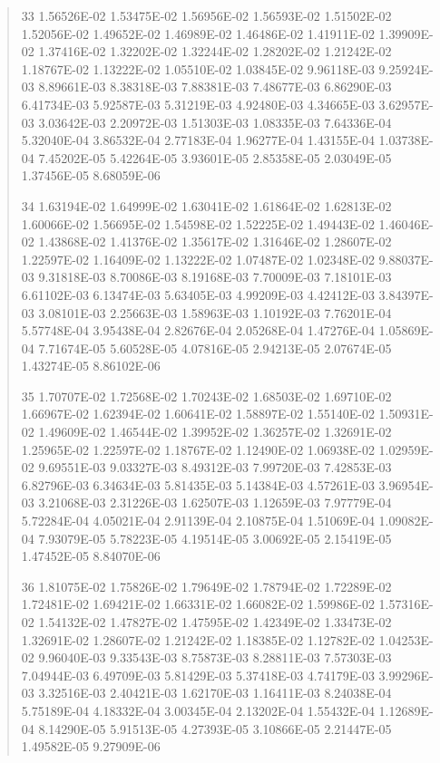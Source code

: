 \documentclass[letterpaper,10pt,english]{sphinxmanual}
\begin{document}
\begin{quote}
\begin{DUlineblock}{0em}
\item[] 33   1.56526E-02  1.53475E-02  1.56956E-02  1.56593E-02  1.51502E-02  1.52056E-02  1.49652E-02  1.46989E-02  1.46486E-02  1.41911E-02  1.39909E-02  1.37416E-02  1.32202E-02  1.32244E-02  1.28202E-02  1.21242E-02  1.18767E-02  1.13222E-02  1.05510E-02  1.03845E-02  9.96118E-03  9.25924E-03  8.89661E-03  8.38318E-03  7.88381E-03  7.48677E-03  6.86290E-03  6.41734E-03  5.92587E-03  5.31219E-03  4.92480E-03  4.34665E-03  3.62957E-03  3.03642E-03  2.20972E-03  1.51303E-03  1.08335E-03  7.64336E-04  5.32040E-04  3.86532E-04  2.77183E-04  1.96277E-04  1.43155E-04  1.03738E-04  7.45202E-05  5.42264E-05  3.93601E-05  2.85358E-05  2.03049E-05  1.37456E-05  8.68059E-06
\item[] 34   1.63194E-02  1.64999E-02  1.63041E-02  1.61864E-02  1.62813E-02  1.60066E-02  1.56695E-02  1.54598E-02  1.52225E-02  1.49443E-02  1.46046E-02  1.43868E-02  1.41376E-02  1.35617E-02  1.31646E-02  1.28607E-02  1.22597E-02  1.16409E-02  1.13222E-02  1.07487E-02  1.02348E-02  9.88037E-03  9.31818E-03  8.70086E-03  8.19168E-03  7.70009E-03  7.18101E-03  6.61102E-03  6.13474E-03  5.63405E-03  4.99209E-03  4.42412E-03  3.84397E-03  3.08101E-03  2.25663E-03  1.58963E-03  1.10192E-03  7.76201E-04  5.57748E-04  3.95438E-04  2.82676E-04  2.05268E-04  1.47276E-04  1.05869E-04  7.71674E-05  5.60528E-05  4.07816E-05  2.94213E-05  2.07674E-05  1.43274E-05  8.86102E-06
\item[] 35   1.70707E-02  1.72568E-02  1.70243E-02  1.68503E-02  1.69710E-02  1.66967E-02  1.62394E-02  1.60641E-02  1.58897E-02  1.55140E-02  1.50931E-02  1.49609E-02  1.46544E-02  1.39952E-02  1.36257E-02  1.32691E-02  1.25965E-02  1.22597E-02  1.18767E-02  1.12490E-02  1.06938E-02  1.02959E-02  9.69551E-03  9.03327E-03  8.49312E-03  7.99720E-03  7.42853E-03  6.82796E-03  6.34634E-03  5.81435E-03  5.14384E-03  4.57261E-03  3.96954E-03  3.21068E-03  2.31226E-03  1.62507E-03  1.12659E-03  7.97779E-04  5.72284E-04  4.05021E-04  2.91139E-04  2.10875E-04  1.51069E-04  1.09082E-04  7.93079E-05  5.78223E-05  4.19514E-05  3.00692E-05  2.15419E-05  1.47452E-05  8.84070E-06
\item[] 36   1.81075E-02  1.75826E-02  1.79649E-02  1.78794E-02  1.72289E-02  1.72481E-02  1.69421E-02  1.66331E-02  1.66082E-02  1.59986E-02  1.57316E-02  1.54132E-02  1.47827E-02  1.47595E-02  1.42349E-02  1.33473E-02  1.32691E-02  1.28607E-02  1.21242E-02  1.18385E-02  1.12782E-02  1.04253E-02  9.96040E-03  9.33543E-03  8.75873E-03  8.28811E-03  7.57303E-03  7.04944E-03  6.49709E-03  5.81429E-03  5.37418E-03  4.74179E-03  3.99296E-03  3.32516E-03  2.40421E-03  1.62170E-03  1.16411E-03  8.24038E-04  5.75189E-04  4.18332E-04  3.00345E-04  2.13202E-04  1.55432E-04  1.12689E-04  8.14290E-05  5.91513E-05  4.27393E-05  3.10866E-05  2.21447E-05  1.49582E-05  9.27909E-06

\end{DUlineblock}
\end{quote}
\end{document}
